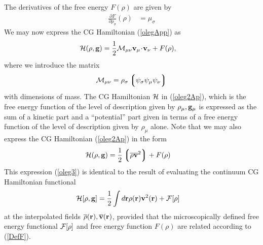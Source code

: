 \documentclass[b5paper,openright,10pt]{book}
\newcommand{\esc}{\!\cdot\!}
\newcommand{\llg}{\left\lgroup}
\newcommand{\rlg}{\right\rgroup}
\begin{document}
\begin{appendices}
The derivatives of the free energy $F(\rho)$  are given by 
\begin{align}
   \frac{\partial F}{\partial\rho_\sigma}(\rho) &=\mu_\sigma
\label{Fd2Ap}
\end{align}
We may now express the CG Hamiltonian (\ref{olegApp}) as
\begin{align}
  {\cal H}(\rho,{\bf g}) &=  \frac{1}{2}{\cal M}_{\mu\nu}{\bf v}_\mu\esc{\bf v}_\nu
+ F(\rho),
\label{oleg2Ap}
\end{align}
where we introduce the matrix
\begin{align}
  {\cal M}_{\mu\nu}={\rho}_\sigma\llg\psi_\sigma\psi_\mu\psi_\nu\rlg
\label{AvecalM}
\end{align}
with dimensions  of mass.  The  CG Hamiltonian ${\cal  H}$ in
(\ref{oleg2Ap}),  which is  the free  energy  function of  the level  of
description given by $\rho_\mu,{\bf g}_\mu$ is expressed as the sum of
a  kinetic part  and a  ``potential'' part  given in  terms of  a free
energy function of the level of description given by $\rho_\mu$ alone.
Note   that  we   may   also  express   the  CG Hamiltonian (\ref{oleg2Ap})
in the form
\begin{align}      {\cal       H}(\rho,{\bf      g})       &=
  \frac{1}{2}\llg\overline{\rho}\overline{\bf v}^2\rlg + F(\rho)
\label{oleg3}
\end{align}
This expression
(\ref{oleg3}) is identical  to the result of  evaluating the continuum
CG Hamiltonian functional
\begin{align}
  {\cal H}[\rho,{\bf g}]&=\frac{1}{2}\int d{\bf r}\rho({\bf r}){\bf v}^2({\bf r})+{\cal F}[\rho]
\end{align}
at  the  interpolated fields  $\overline{\rho}({\bf  r}),\overline{\bf
  v}({\bf r})$, provided that  the microscopically defined free energy
functional  ${\cal F}[\rho]$  and free  energy function  $F(\rho)$ are
related according to (\ref{DefF}).


\end{appendices}
\end{document}
